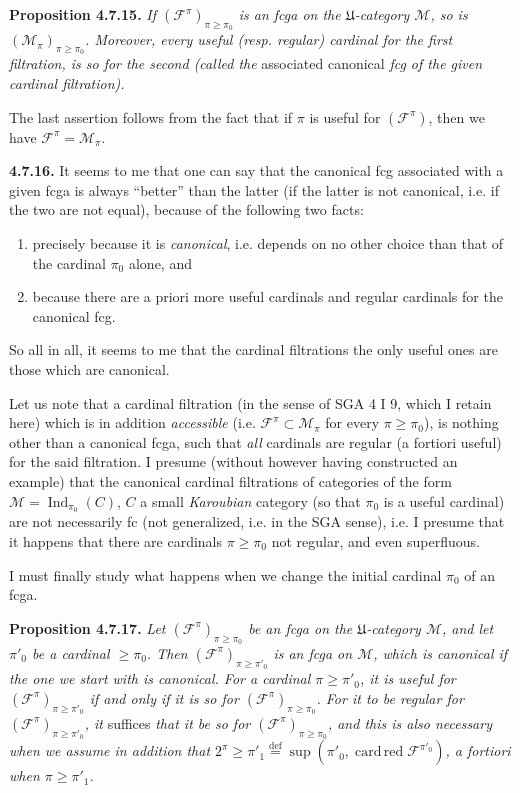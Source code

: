 \documentclass[11pt]{article}
\newcommand{\printedpage}[1]{\marginpar{\footnotesize p.~#1}}
\newcommand{\msp}[1]{\marginpar{\footnotesize [#1]}}
\newcommand{\Ind}{\operatorname{Ind}}
\newcommand{\cardred}{\operatorname{card\,red}}
\begin{document}
\textbf{Proposition 4.7.15.} \textit{If $(\mathcal{F}^{\pi})_{\pi\geqslant\pi_0}$ is an fcga on the $\mathfrak{U}$-category $\mathcal{M}$, so is $(\mathcal{M}_\pi)_{\pi\geqslant\pi_0}$. Moreover, every useful (resp. regular) cardinal for the first filtration, is so for the second (called the} associated canonical \textit{fcg of the given} \textit{cardinal filtration).}

The last assertion follows from the fact that if $\pi$ is useful for $(\mathcal{F}^{\pi})$, then we have $\mathcal{F}^{\pi}=\mathcal{M}_\pi$.

\textbf{4.7.16.} It seems to me that one can say that the canonical fcg associated with a given fcga
\msp{page 181}
is always ``better'' than the latter (if the latter is not canonical, i.e. if the two are not equal), because of the following two facts:
\begin{enumerate}[label=\alph*)]
\item precisely because it is \textit{canonical}, i.e. depends on no other choice than that of the cardinal $\pi_0$ alone, and
\item because there are a priori more useful cardinals and regular cardinals for the canonical fcg.
\end{enumerate}
So all in all, it seems to me that the cardinal filtrations the only useful ones are those which are canonical.

\noindent\printedpage{62}
Let us note that a cardinal filtration (in the sense of SGA 4 I 9, which I retain here) which is in addition \textit{accessible} (i.e. $\mathcal{F}^{\pi}\subset\mathcal{M}_\pi$ for every $\pi\geqslant\pi_0$), is nothing other than a canonical fcga, such that \textit{all} cardinals are regular (a fortiori useful) for the said filtration. I presume (without however having constructed an example) that the canonical cardinal filtrations of categories of the form $\mathcal{M}=\Ind_{\pi_0}(C)$, $C$ a small \textit{Karoubian} category (so that $\pi_0$ is a useful cardinal) are not necessarily fc (not generalized, i.e. in the SGA sense), i.e. I presume that it happens that there are cardinals $\pi\geqslant\pi_0$ not regular, and even superfluous.

\noindent\msp{page 182}I must finally study what happens when we change the initial cardinal $\pi_0$ of an fcga.

\textbf{Proposition 4.7.17.} \textit{Let $(\mathcal{F}^{\pi})_{\pi\geqslant\pi_0}$ be an fcga on the $\mathfrak{U}$-category $\mathcal{M}$, and let $\pi'_0$ be a cardinal $\geqslant\pi_0$. Then $(\mathcal{F}^{\pi})_{\pi\geqslant\pi'_0}$ is an fcga on $\mathcal{M}$, which is canonical if the one we start with is canonical. For a cardinal $\pi\geqslant\pi'_0$, it is useful for $(\mathcal{F}^{\pi})_{\pi\geqslant\pi'_0}$ if and only if it is so for $(\mathcal{F}^{\pi})_{\pi\geqslant\pi_0}$. For it to be regular for $(\mathcal{F}^{\pi})_{\pi\geqslant\pi'_0}$, it} suffices \textit{that it be so for $(\mathcal{F}^{\pi})_{\pi\geqslant\pi_0}$, and this is also necessary when we assume in addition that $2^{\pi}\geqslant\pi'_1\overset{\text{def}}{=}\sup(\pi'_0,\cardred\mathcal{F}^{\pi'_0})$, a fortiori when $\pi\geqslant\pi'_1$.}
\end{document}
